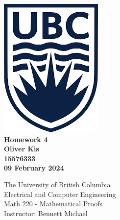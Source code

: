 \documentclass[letterpaper, 12pt]{article}
\newcommand{\myname}{Oliver Kis}
\newcommand{\mystudentnumber}{15576333}
\newcommand{\hw}{4} %
\newcommand{\dates}{09 February 2024}
\theoremstyle{definition}
\begin{document}
\begin{titlepage}
\centering
    \includegraphics{UBC.png}\\
    \vspace{1cm}
    {\bfseries\large
    Homework \hw \\
    \vspace{0.5cm}
    \myname\\
    \vspace{0.5cm}
    \mystudentnumber\\
    \vspace{0.5cm}
    \dates\\  %
    }
    
    \vfill
    {\large
    The University of British Columbia\\
    \vspace{0.25cm}
    Electrical and Computer Engineering\\
    \vspace{0.25cm}
    Math 220 - Mathematical Proofs\\
    \vspace{0.25cm}
    Instructor: Bennett Michael\\
    }


\end{titlepage}
\end{document}

